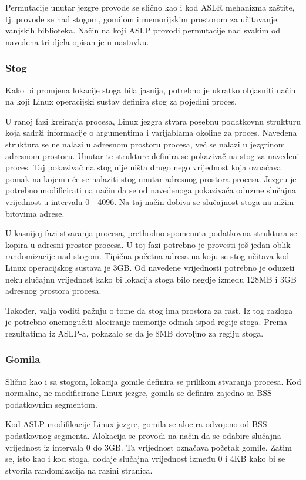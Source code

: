 \documentclass[times, utf8, diplomski, numeric]{fer}
\begin{document}
Permutacije unutar jezgre provode se slično kao i kod ASLR mehanizma zaštite, tj. provode se nad stogom, gomilom i memorijskim prostorom za učitavanje vanjskih biblioteka. Način na koji ASLP provodi permutacije nad svakim od navedena tri djela opisan je u nastavku.

\subsubsection{Stog}
Kako bi promjena lokacije stoga bila jasnija, potrebno je ukratko objasniti način na koji Linux operacijski sustav definira stog za pojedini proces. 

U ranoj fazi kreiranja procesa, Linux jezgra stvara posebnu podatkovnu strukturu koja sadrži informacije o argumentima i varijablama okoline za proces. Navedena struktura se ne nalazi u adresnom prostoru procesa, već se nalazi u jezgrinom adresnom prostoru. Unutar te strukture definira se pokazivač na stog za navedeni proces. Taj pokazivač na stog nije ništa drugo nego vrijednost koja označava pomak na kojemu će se nalaziti stog unutar adresnog prostora procesa. Jezgru je potrebno modificirati na način da se od navedenoga pokazivača oduzme slučajna vrijednost u intervalu 0 - 4096. Na taj način dobiva se slučajnost stoga na nižim bitovima adrese.

U kasnijoj fazi stvaranja procesa, prethodno spomenuta podatkovna struktura se kopira u adresni prostor procesa. U toj fazi potrebno je provesti još jedan oblik randomizacije nad stogom. Tipična početna adresa na koju se stog učitava kod Linux operacijskog sustava je 3GB. Od navedene vrijednosti potrebno je oduzeti neku slučajnu vrijednost kako bi lokacija stoga bilo negdje između 128MB i 3GB adresnog prostora procesa.

Također, valja voditi pažnju o tome da stog ima prostora za rast. Iz tog razloga je potrebno onemogućiti alociranje memorije odmah ispod regije stoga. Prema rezultatima iz ASLP-a, pokazalo se da je 8MB dovoljno za 
regiju stoga.

\subsubsection{Gomila}
Slično kao i sa stogom, lokacija gomile definira se prilikom stvaranja procesa. Kod normalne, ne modificirane Linux jezgre, gomila se definira zajedno sa BSS podatkovnim segmentom. 

Kod ASLP modifikacije Linux jezgre, gomila se alocira odvojeno od BSS podatkovnog segmenta. Alokacija se provodi na način da se odabire slučajna vrijednost iz intervala 0 do 3GB. Ta vrijednost označava početak gomile. Zatim se, isto kao i kod stoga, dodaje slučajna vrijednost između 0 i 4KB kako bi se stvorila randomizacija na razini stranica.
\end{document}
